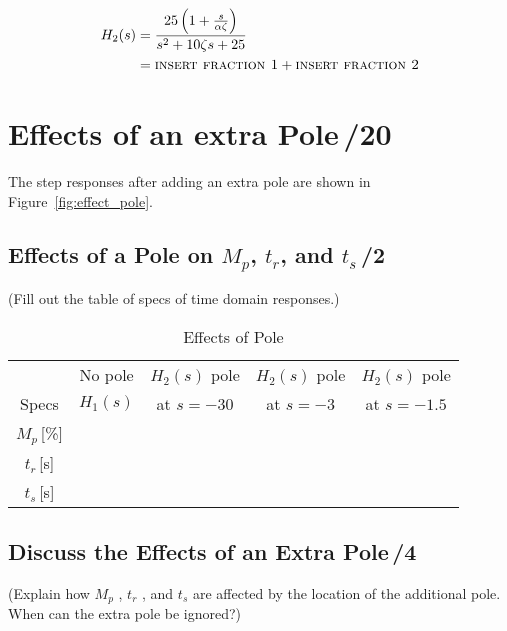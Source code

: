 \documentclass{article}
\newcommand{\score}{\hfill \underline{\hspace{0.65cm}}\,/} %
\begin{document}
\begin{align*}
H_2(s) &=\frac{25 \left( 1+\frac{s}{\alpha \zeta} \right)}{s^2+10\zeta s +25}\\
       &= \mbox{\sc insert fraction 1} + \mbox{\sc insert fraction 2}
\end{align*}

\section{{\sc Effects of an extra Pole}\score 20}
The step responses after adding an extra pole are shown in Figure~\ref{fig:effect_pole}.

\subsection{Effects of a Pole on $M_p$, $t_r$, and $t_s$\score 2}
(Fill out the table of specs of time domain responses.)
\begin{table}[phtb]
\begin{center}
\caption{Effects of Pole}
 \label{tbl:lab2_q3}
\begin{tabular}{c|c|c|c|c} \hline \hline
\rowcolor{Grey} & No pole & $H_2(s)$ pole & $H_2(s)$ pole & $H_2(s)$ pole \\
\rowcolor{Grey} Specs &  $H_1(s)$ &  at $s = -30$ &  at $s = -3$ & at $s = -1.5$ \\ \hline   
$M_p$\,[\%] &  &  &  &  \\ \hline
$t_r$\,[s] &  &  &  &  \\ \hline
$t_s$\,[s] &  &  &  &  \\ \hline
\end{tabular}
\end{center}
\end{table}

\subsection{Discuss the Effects of an Extra Pole\score 4}
(Explain how $M_p$ , $t_r$ , and $t_s$ are affected by the location of the additional pole. When can the extra pole be ignored?)
\end{document}
